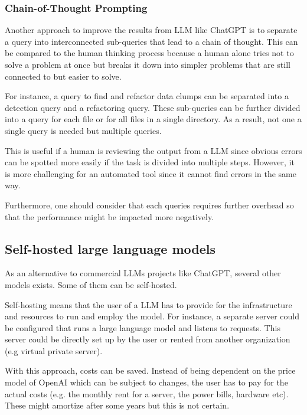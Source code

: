 \subsubsection{Chain-of-Thought Prompting}\label{sec:chain of thought}

Another approach to improve the results from \ac{LLM} like ChatGPT is to separate a query into interconnected sub-queries that lead to a chain of thought. This can be compared to the human thinking process because a human alone tries not to solve a problem at once but breaks it down into simpler problems that are still connected to but easier to solve. \cite{Wei2022ChainOT}

For instance, a query to find and refactor data clumps can be separated into a detection query and a refactoring query. These sub-queries can be further divided into a query for each file or for all files in a single directory. As a result, not one a single query is needed but multiple queries. 

This is useful if a human is reviewing the output from a \ac{LLM} since obvious errors can be spotted more easily if the task is divided into multiple steps. However, it is more challenging for an automated tool since it cannot find errors in the same way. 

Furthermore, one should consider that each queries requires further overhead so that the performance might be impacted more negatively. 
\subsection{Self-hosted large language models}

As an alternative to commercial  \ac{LLM}s projects like ChatGPT, several other models exists. Some of them can be self-hosted.  

Self-hosting means that the user of a \ac{LLM} has to provide for the infrastructure and resources to run and employ the model. For instance, a separate server could be configured that runs a large language model and listens to requests. This server could be directly set up by the user or rented from another organization (e.g virtual private server). 

With this approach, costs can be saved. Instead of being dependent on the price model of OpenAI which can be subject to changes, the user has to pay for the actual costs (e.g. the monthly rent for a server, the power bills, hardware etc). These might amortize after some years but this is not certain.

